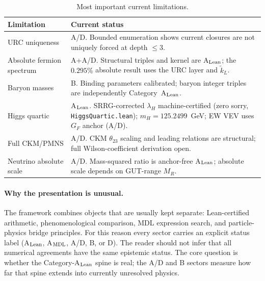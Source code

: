 \documentclass[11pt]{article}
\theoremstyle{remark}
\begin{document}
\begin{table}[H]
\centering
\caption{Most important current limitations.}
\label{tab:main_limitations}
\small
\renewcommand{\arraystretch}{1.15}
\begin{tabularx}{\linewidth}{@{}p{3.0cm}X@{}}
\toprule
\textbf{Limitation} & \textbf{Current status} \\
\midrule
URC uniqueness & A/D.  Bounded enumeration shows current closures are not uniquely forced at depth $\le 3$. \\
Absolute fermion spectrum & A+A/D.  Structural triples and kernel are A$_{\rm Lean}$; the $0.295\%$ absolute result uses the URC layer and $\tilde{k}_L$. \\
Baryon masses & B.  Binding parameters calibrated; baryon integer triples are independently Category~A$_{\rm Lean}$. \\
Higgs quartic & A$_{\rm Lean}$.  SRRG-corrected $\lambda_H$ machine-certified (zero sorry, \texttt{HiggsQuartic.lean}); $m_H = 125.2499$~GeV; EW VEV uses $G_F$ anchor (A/D). \\
Full CKM/PMNS & A/D.  CKM $\theta_{23}$ scaling and leading relations are structural; full Wilson-coefficient derivation open. \\
Neutrino absolute scale & A/D.  Mass-squared ratio is anchor-free A$_{\rm Lean}$; absolute scale depends on GUT-range $M_R$. \\
\bottomrule
\end{tabularx}
\end{table}

\paragraph{Why the presentation is unusual.}
The framework combines objects that are usually kept separate: Lean-certified arithmetic, phenomenological comparison, MDL expression search, and particle-physics bridge principles.
For this reason every sector carries an explicit status label (A$_{\rm Lean}$, A$_{\rm MDL}$, A/D, B, or D).
The reader should not infer that all numerical agreements have the same epistemic status.
The core question is whether the Category-A$_{\rm Lean}$ spine is real; the A/D and B sectors measure how far that spine extends into currently unresolved physics.
\end{document}
